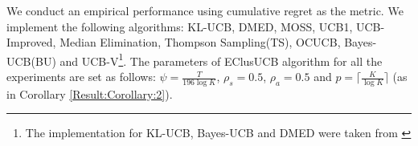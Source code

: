 We conduct an empirical performance using cumulative regret as the metric. We implement the following algorithms:  KL-UCB\cite{garivier2011kl}, DMED\cite{honda2010asymptotically}, MOSS\cite{audibert2009minimax}, UCB1\cite{auer2002finite}, UCB-Improved\cite{auer2010ucb}, Median Elimination\cite{even2006action}, Thompson Sampling(TS)\cite{agrawal2011analysis}, OCUCB\cite{lattimore2015optimally}, Bayes-UCB(BU)\cite{kaufmann2012bayesian} and UCB-V\cite{audibert2009exploration}\footnote{The implementation for KL-UCB, Bayes-UCB and DMED were taken from \cite{CapGarKau12}}. The parameters of EClusUCB algorithm for all the experiments are set as follows: $\psi=\frac{T}{196 \log K}$, $\rho_{s}=0.5$, $\rho_{a}=0.5$ and $p=\lceil\frac{K}{\log K}\rceil$ (as in Corollary \ref{Result:Corollary:2}).

